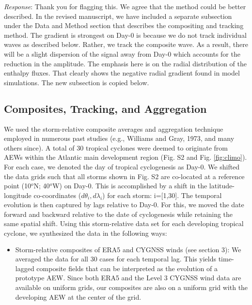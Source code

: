 \documentclass[10pt, letterpaper]{article}
\begin{document}
{\emph{Response}: Thank you for flagging this. We agree that the method could be better described. In the revised manuscript, we have included a separate subsection under the Data and Method section that
describes the compositing and tracking method. The gradient is strongest on Day-0 is because we do not track individual waves as described below. Rather, we track the composite wave. As a result, there will be a slight dispersion of the signal away from Day-0 which accounts for the reduction in the amplitude. The emphasis here is on the radial distribution of the enthalpy fluxes. That clearly shows the negative radial gradient found in model simulations.  The new subsection is copied below. \\


\begin{tcolorbox}[sharp corners, colframe=white]
\subsection{Composites, Tracking, and Aggregation}

We used the storm-relative composite averages and aggregation technique employed in numerous past studies (e.g., Williams and Gray, 1973, and many others since). A total of 30 tropical cyclones were deemed to originate from AEWs within the Atlantic main development region (Fig. S2 and  Fig. \ref{fig:climo}). For each case, we denoted the day of tropical cyclogenesis as Day-0.  We shifted the data grids such that all storms shown in Fig. S2 are co-located at a reference point (10$^o$N; 40$^o$W) on Day-0. This is accomplished by a shift in the latitude-longitude co-coordinates ($d \theta_i, d \lambda_i$) for each storm: i=[1,30]. The temporal evolution is then captured by lags relative to Day-0. For this, we moved the date forward and backward relative to the date of cyclogenesis while retaining the same spatial shift.  Using this storm-relative data set for each developing tropical cyclone, we synthesized the data in the following ways:
\end{tcolorbox}

\newpage
\begin{tcolorbox}[sharp corners, colframe=white]

\begin{itemize}
    \item Storm-relative composites of ERA5 and CYGNSS winds (see section 3): We averaged the data for all 30 cases for each temporal lag. This yields time-lagged composite fields that can be interpreted as the evolution of a prototype AEW. Since both ERA5 and the Level 3 CYGNSS wind data are available on uniform grids, our composites are also on a uniform grid with the developing AEW at the center of the grid.


\end{itemize}
\end{tcolorbox}}
\end{document}
